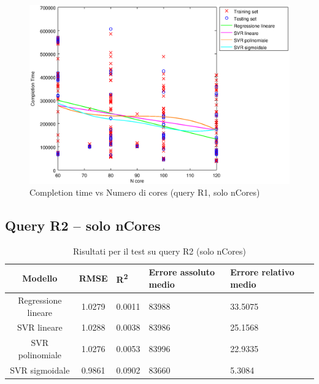\documentclass[a4paper,11pt]{article}
\begin{document}
\begin {figure}[hbtp]
\centering
\includegraphics[width=\textwidth]{output/R1_SOLO_CORE/plot_R1_-.eps}
\caption {Completion time vs Numero di cores (query R1, solo nCores)}
\end {figure}

\newpage
\subsection{Query R2 -- solo nCores}
\begin{table}[bhpt]
	\centering
	\begin{adjustbox}{center}
		\begin{tabular}{c | c M{1.2cm} M{2.5cm} M{2.5cm} M{1.8cm}}
			Modello & RMSE & R\textsuperscript{2} & Errore assoluto medio & Errore relativo medio \tabularnewline
			\hline
			Regressione lineare & 1.0279 & 0.0011 &  83988 & 33.5075 \\
			SVR lineare & 1.0288 & 0.0038 &  83986 & 25.1568 \\
			SVR polinomiale & 1.0276 & 0.0053 &  83996 & 22.9335 \\
			SVR sigmoidale & 0.9861 & 0.0902 &  83660 & 5.3084 \\
		\end{tabular}
	\end{adjustbox}
	\\
	\caption{Risultati per il test su query R2 
(solo nCores)}
	\label{table_R2_nCores}
\end{table}
\end{document}
